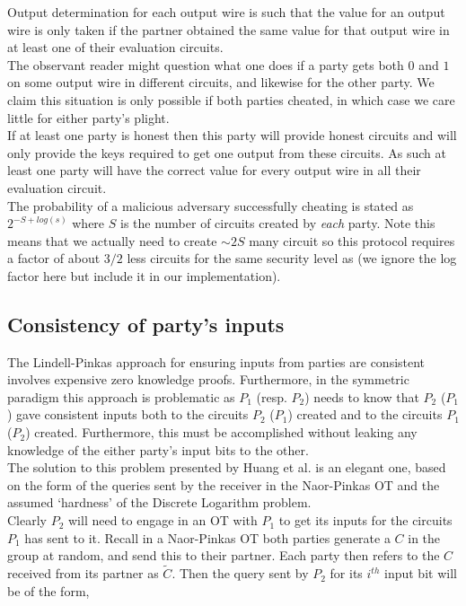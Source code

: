 \documentclass[ %
                    author={Nicholas Tutte},
                supervisor={Prof. Nigel Smart},
                    degree={MEng},
                     title={Secure Two Party Computation},
                  subtitle={A practical comparison of recent protocols},
                      type={Research - GG1K},
                      year={2015} ]{dissertation}
\begin{document}
				Output determination for each output wire is such that the value for an output wire is only taken if the partner obtained the same value for that output wire in at least one of their evaluation circuits.\\

				The observant reader might question what one does if a party gets both $0$ and $1$ on some output wire in different circuits, and likewise for the other party. We claim this situation is only possible if both parties cheated, in which case we care little for either party's plight.\\

				If at least one party is honest then this party will provide honest circuits and will only provide the keys required to get one output from these circuits. As such at least one party will have the correct value for every output wire in all their evaluation circuit.\\

				The probability of a malicious adversary successfully cheating is stated as $2^{-S + log(s)}$ where $S$ is the number of circuits created by \emph{each} party. Note this means that we actually need to create $\sim 2S$ many circuit so this protocol requires a factor of about $3/2$ less circuits for the same security level as \cite{LindellAndPinkas2011} (we ignore the log factor here but include it in our implementation).
				
			\subsection{Consistency of party's inputs} \label{sub:HKE_Consistency}
				The Lindell-Pinkas approach for ensuring inputs from parties are consistent involves expensive zero knowledge proofs. Furthermore, in the symmetric paradigm this approach is problematic as $P_1$ (resp. $P_2$) needs to know that $P_2$ ($P_1$) gave consistent inputs both to the circuits $P_2$ ($P_1$) created and to the circuits $P_1$ ($P_2$) created. Furthermore, this must be accomplished without leaking any knowledge of the either party's input bits to the other.\\

				The solution to this problem presented by Huang et al. is an elegant one, based on the form of the queries sent by the receiver in the Naor-Pinkas OT and the assumed `hardness' of the Discrete Logarithm problem.\\

				Clearly $P_2$ will need to engage in an OT with $P_1$ to get its inputs for the circuits $P_1$ has sent to it. Recall in a Naor-Pinkas OT both parties generate a $C$ in the group at random, and send this to their partner. Each party then refers to the $C$ received from its partner as $\tilde C$. Then the query sent by $P_2$ for its $i^{th}$ input bit will be of the form,
\end{document}
